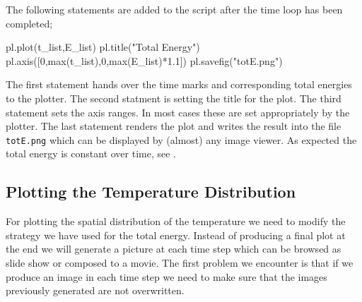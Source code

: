 The following statements are added to the script after the time loop has been completed;
\begin{python}
pl.plot(t_list,E_list)
pl.title("Total Energy")
pl.axis([0,max(t_list),0,max(E_list)*1.1])
pl.savefig("totE.png")
\end{python}
The first statement hands over the time marks and corresponding total energies to the plotter. 
The second statment is setting the title for the plot. The third statement
sets the axis ranges. In most cases these are set appropriately by the plotter.  
The last statement renders the plot and writes the 
result into the file \verb|totE.png| which can be displayed by (almost) any image viewer. 
As expected the total energy is constant over time, see .

\subsection{Plotting the Temperature Distribution}
For plotting the spatial distribution of the temperature we need to modify the strategy we have used
for the total energy. Instead of producing a final plot at the end we will generate a 
picture at each time step which can be browsed as slide show or composed to a movie.
The first problem we encounter is that if we produce an image in each time step we need
to make sure that the images previously generated are not overwritten.

